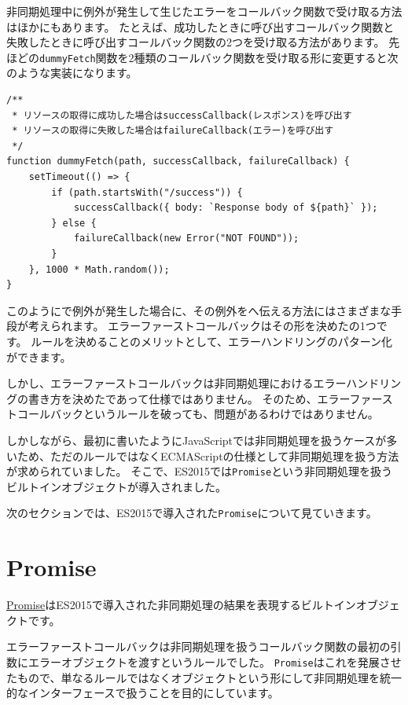 非同期処理中に例外が発生して生じたエラーをコールバック関数で受け取る方法はほかにもあります。
たとえば、成功したときに呼び出すコールバック関数と失敗したときに呼び出すコールバック関数の2つを受け取る方法があります。
先ほどの\texttt{dummyFetch}関数を2種類のコールバック関数を受け取る形に変更すると次のような実装になります。

\begin{lstlisting}
/**
 * リソースの取得に成功した場合はsuccessCallback(レスポンス)を呼び出す
 * リソースの取得に失敗した場合はfailureCallback(エラー)を呼び出す
 */
function dummyFetch(path, successCallback, failureCallback) {
    setTimeout(() => {
        if (path.startsWith("/success")) {
            successCallback({ body: `Response body of ${path}` });
        } else {
            failureCallback(new Error("NOT FOUND"));
        }
    }, 1000 * Math.random());
}
\end{lstlisting}

このように\textbf{}で例外が発生した場合に、その例外を\textbf{}へ伝える方法にはさまざまな手段が考えられます。
エラーファーストコールバックはその形を決めた\textbf{}の1つです。
ルールを決めることのメリットとして、エラーハンドリングのパターン化ができます。

しかし、エラーファーストコールバックは非同期処理におけるエラーハンドリングの書き方を決めた\textbf{}であって仕様ではありません。
そのため、エラーファーストコールバックというルールを破っても、問題があるわけではありません。

しかしながら、最初に書いたようにJavaScriptでは非同期処理を扱うケースが多いため、ただのルールではなくECMAScriptの仕様として非同期処理を扱う方法が求められていました。
そこで、ES2015では\texttt{Promise}という非同期処理を扱うビルトインオブジェクトが導入されました。

次のセクションでは、ES2015で導入された\texttt{Promise}について見ていきます。

\hypertarget{promise}{%
\section[Promise]{Promise\protect{}}\label{promise}}

\href{https://developer.mozilla.org/ja/docs/Web/JavaScript/Reference/Global_Objects/Promise}{Promise}はES2015で導入された非同期処理の結果を表現するビルトインオブジェクトです。

エラーファーストコールバックは非同期処理を扱うコールバック関数の最初の引数にエラーオブジェクトを渡すというルールでした。
\texttt{Promise}はこれを発展させたもので、単なるルールではなくオブジェクトという形にして非同期処理を統一的なインターフェースで扱うことを目的にしています。

